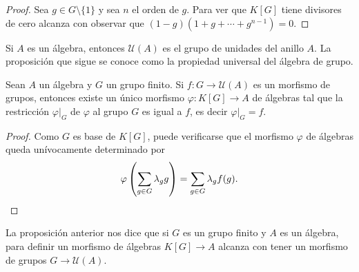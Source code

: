 \begin{proof}
Sea $g\in G\setminus\{1\}$ y sea $n$ el orden de $g$. Para ver que $K[G]$ tiene divisores
de cero alcanza con observar que 
$(1-g)(1+g+\cdots+g^{n-1})=0$. 
\end{proof}

Si $A$ es un álgebra, entonces $\mathcal{U}(A)$ es el grupo de unidades del anillo $A$. 
La proposición que sigue se conoce como la propiedad universal del álgebra de grupo.

\begin{proposition}
Sean $A$ un álgebra y $G$ un grupo finito. Si $f\colon G\to\mathcal{U}(A)$ es un morfismo de grupos, entonces
existe un único morfismo $\varphi\colon K[G]\to A$ de álgebras tal que la restricción
$\varphi|_G$ de $\varphi$ al grupo $G$ es igual a $f$, es decir 	$\varphi|_G=f$. 
\end{proposition}

\begin{proof}
Como $G$ es base de $K[G]$, puede verificarse que 
el morfismo $\varphi$ de álgebras 
queda unívocamente determinado por 
\[
\varphi\left(\sum_{g\in G}\lambda_gg\right)=\sum_{g\in G}\lambda_gf(g).\qedhere
\]	
\end{proof}

La proposición anterior nos dice que si $G$ es un grupo finito y $A$ es un álgebra, 
para definir un morfismo de álgebras $K[G]\to A$ 
alcanza con tener un morfismo de grupos $G\to\mathcal{U}(A)$.  

